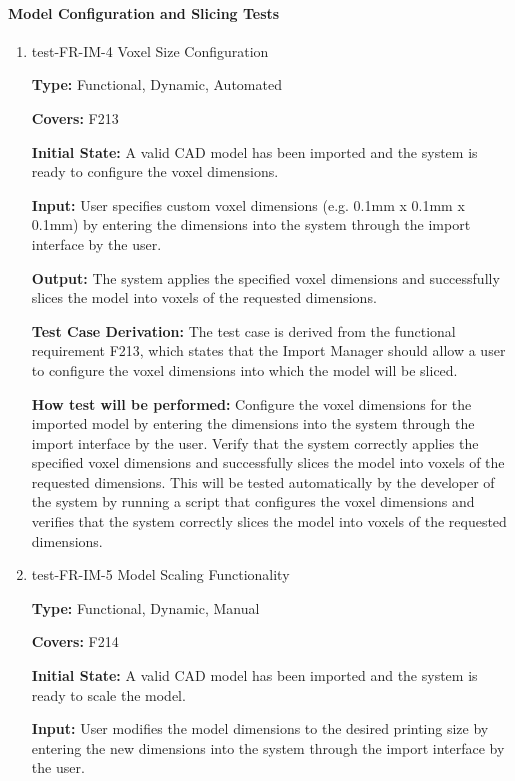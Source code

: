 \documentclass[12pt, titlepage]{article}
\begin{document}
\paragraph{Model Configuration and Slicing Tests}

\begin{enumerate}

\item{test-FR-IM-4 Voxel Size Configuration\\}

\textbf{Type:} Functional, Dynamic, Automated

\textbf{Covers:} F213
					
\textbf{Initial State:} A valid CAD model has been imported and the system is ready to configure the voxel dimensions.
					
\textbf{Input:} User specifies custom voxel dimensions (e.g. 0.1mm x 0.1mm x 0.1mm) by entering the dimensions into the system through the import interface by the user.
					
\textbf{Output:} The system applies the specified voxel dimensions and successfully slices the model into voxels of the requested dimensions.

\textbf{Test Case Derivation:} The test case is derived from the functional requirement F213, which states that the Import Manager should allow a user to configure the voxel dimensions into which the model will be sliced.
					
\textbf{How test will be performed:} Configure the voxel dimensions for the imported model by entering the dimensions into the system through the import interface by the user. Verify that the system correctly applies the specified voxel dimensions and successfully slices the model into voxels of the requested dimensions. This will be tested automatically by the developer of the system by running a script that configures the voxel dimensions and verifies that the system correctly slices the model into voxels of the requested dimensions.

\item{test-FR-IM-5 Model Scaling Functionality\\}

\textbf{Type:} Functional, Dynamic, Manual

\textbf{Covers:} F214
					
\textbf{Initial State:} A valid CAD model has been imported and the system is ready to scale the model.
					
\textbf{Input:} User modifies the model dimensions to the desired printing size by entering the new dimensions into the system through the import interface by the user.
					

\end{enumerate}
\end{document}
